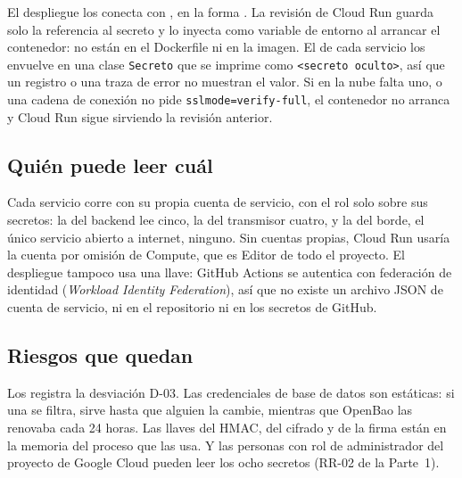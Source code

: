 \documentclass[11pt,a4paper]{article}
\theoremstyle{definition}
\theoremstyle{remark}
\newcommand{\code}[1]{\texttt{#1}}
\begin{document}
El despliegue los conecta con , en la forma
. La revisi\'on de Cloud Run guarda solo la
referencia al secreto y lo inyecta como variable de entorno al arrancar el
contenedor: no est\'an en el Dockerfile ni en la imagen. El
 de cada servicio los envuelve en una clase \code{Secreto} que
se imprime como \code{<secreto oculto>}, as\'i que un registro o una traza de
error no muestran el valor. Si en la nube falta uno, o una cadena de
conexi\'on no pide \code{sslmode=verify-full}, el contenedor no arranca y Cloud
Run sigue sirviendo la revisi\'on anterior.

\subsection*{Qui\'en puede leer cu\'al}

Cada servicio corre con su propia cuenta de servicio, con el rol
 solo sobre sus secretos: la del
backend lee cinco, la del transmisor cuatro, y la del borde, el \'unico
servicio abierto a internet, ninguno. Sin cuentas propias, Cloud Run usar\'ia
la cuenta por omisi\'on de Compute, que es Editor de todo el proyecto. El
despliegue tampoco usa una llave: GitHub Actions se autentica con federaci\'on
de identidad (\emph{Workload Identity Federation}), as\'i que no existe un
archivo JSON de cuenta de servicio, ni en el repositorio ni en los secretos de
GitHub.

\subsection*{Riesgos que quedan}

Los registra la desviaci\'on D-03. Las credenciales de base de datos son
est\'aticas: si una se filtra, sirve hasta que alguien la cambie, mientras que
OpenBao las renovaba cada 24 horas. Las llaves del HMAC, del cifrado y de la
firma est\'an en la memoria del proceso que las usa. Y las personas con rol de
administrador del proyecto de Google Cloud pueden leer los ocho secretos
(RR-02 de la Parte~1).

%
\end{document}
